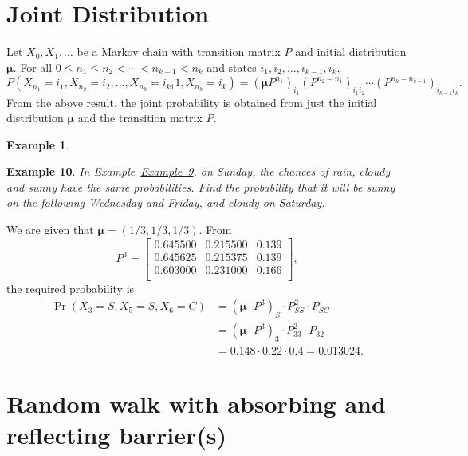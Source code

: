\documentclass[
]{book}
\theoremstyle{definition}
\theoremstyle{definition}
\newtheorem{example}{Example}[chapter]
\theoremstyle{definition}
\theoremstyle{definition}
\theoremstyle{remark}
\begin{document}
\hypertarget{joint-distribution}{%
\section{Joint Distribution}\label{joint-distribution}}

Let \(X_0, X_1, \ldots\) be a Markov chain with transition matrix \(P\) and
initial distribution \(\boldsymbol{\mu}.\) For all
\(0 \le n_1 \le n_2 < \cdots < n_{k-1} < n_k\) and states
\(i_1, i_2, \ldots , i_{k-1}, i_k,\)
\[P(X_{n_1} = i_1, X_{n_2} = i_2,\ldots, X_{n_k} = i_{k1}1, X_{n_k} = i_k)
= (\boldsymbol{\mu} P^{n_1} )_{i_1} (P^{n_2 - n_1} )_{i_1i_2} \cdots (P^{n_k - n_{k -1}} )_{i_{k-1}i_k}.\]
From the above result, the joint probability is obtained from just the
initial distribution \(\boldsymbol{\mu}\) and the transition matrix \(P\).

\begin{example}
\protect\hypertarget{exm:unlabeled-div-19}{}\label{exm:unlabeled-div-19}

\textbf{Example 10}. \emph{In Example~\protect\hyperlink{weather}{Example~9}, on Sunday, the chances of rain, cloudy and sunny
have the same probabilities. Find the probability that it will be sunny
on the following Wednesday and Friday, and cloudy on Saturday.}

\end{example}

We are given that \(\boldsymbol{\mu} = (1/3, 1/3, 1/3).\) From
\[P^3 = \begin{bmatrix}
    0.645500 & 0.215500 & 0.139   \\
    0.645625 & 0.215375 & 0.139  \\
    0.603000 & 0.231000 & 0.166   \\
\end{bmatrix},\] the required probability is \[\begin{aligned}
 \Pr(X_3 = S, X_5 = S, X_6 = C) &= (\boldsymbol{\mu}  \cdot P^3)_S \cdot  P^{2}_{SS} \cdot P_{SC} \\
&= (\boldsymbol{\mu}  \cdot P^3)_3 \cdot P^{2}_{33} \cdot P_{32}  \\
&= 0.148 \cdot  0.22 \cdot 0.4 = 0.013024.\end{aligned}\]

\hypertarget{random-walk-with-absorbing-and-reflecting-barriers}{%
\section{Random walk with absorbing and reflecting barrier(s)}\label{random-walk-with-absorbing-and-reflecting-barriers}}
\end{document}
